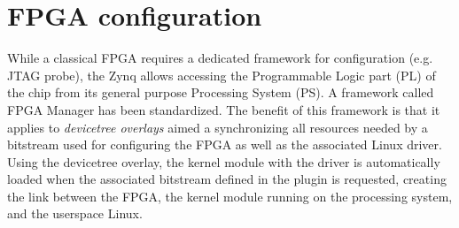 \documentclass{article}
\begin{document}
{{\section{FPGA configuration}

While a classical FPGA requires a dedicated framework for configuration (e.g. JTAG probe),
the Zynq allows accessing the Programmable Logic part (PL) of the chip from its general
purpose Processing System (PS). 
A framework called FPGA Manager has been 
standardized. The benefit of this framework is that it applies to {\em devicetree overlays}
aimed a synchronizing all resources needed by a bitstream used for configuring the FPGA
as well as the associated Linux driver. Using the devicetree overlay, the kernel module
with the driver is automatically loaded when the associated bitstream defined in the
plugin is requested, creating the link between the FPGA, the kernel module running on the processing
system, and the userspace Linux.

}}
\end{document}
